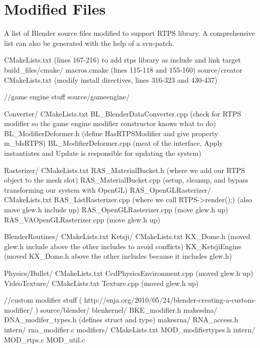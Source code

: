 
\chapter{Modified Files}
\label{appendix:modified}
A list of Blender source files modified to support RTPS library.
A comprehensive list can also be generated with the help of a svn-patch. 

\begin{cppcode}{0}

CMakeLists.txt (lines 167-216) to add rtps library as include and link target
build_files/cmake/
    macros.cmake (lines 115-118 and 155-160)
source/creator
    CMakeLists.txt (modify install directives, lines 316-323 and 430-437)

//game engine stuff
source/gameengine/

    Converter/
        CMakeLists.txt
        BL_BlenderDataConverter.cpp (check for RTPS modifier so the game engine modifier constructor knows what to do)
        BL_ModifierDeformer.h (define HasRTPSModifier and give property m_bIsRTPS)
        BL_ModifierDeformer.cpp (meat of the interface, Apply instantiates and Update is responsible for updating the system)       
 
    Rasterizer/
        CMakeLists.txt
        RAS_MaterialBucket.h (where we add our RTPS object to the mesh slot)
        RAS_MaterialBucket.cpp (setup, cleanup, and bypass transforming our system with OpenGL)
        RAS_OpenGLRasterizer/
            CMakeLists.txt
            RAS_ListRasterizer.cpp (where we call RTPS->render();) (also move glew.h include up)
            RAS_OpenGLRasterizer.cpp (move glew.h up)
            RAS_VAOpenGLRasterizer.cpp (move glew.h up)

    BlenderRoutines/
        CMakeLists.txt
    Ketsji/
        CMakeLists.txt
        KX_Dome.h (moved glew.h include above the other includes to avoid conflicts)
        KX_KetsjiEngine (moved KX_Dome.h above the other includes because it includes glew.h)

    Physics/Bullet/
        CMakeLists.txt
        CcdPhysicsEnvironment.cpp (moved glew.h up) 
    VideoTexture/
        CMakeLists.txt 
        Texture.cpp (moved glew.h up)

//custom modifier stuff ( http://enja.org/2010/05/24/blender-creating-a-custom-modifier/ )
source/blender/
    blenkernel/
        BKE_modifier.h
    makesdna/
        DNA_modifer_types.h (defines struct and type)
    makesrna/
        RNA_access.h 
        intern/
            rna_modifier.c
    modifiers/
        CMakeLists.txt
        MOD_modifiertypes.h
        intern/
            MOD_rtps.c
            MOD_util.c
    

\end{cppcode}
